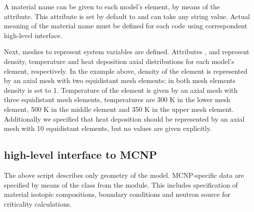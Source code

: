\documentclass[a4paper,10pt,twocolumn,english]{sphinxsnamc2013}
\begin{document}
A material name can be given to each model's element, by means of the 
attribute.  This attribute is set by default  to  and can take
any string value.  Actual meaning of the material name must be defined for each
code using correspondent high-level interface.

Next, meshes to represent system variables are defined. Attributes ,
 and  represent density, temperature and heat deposition axial
distributions for each model's element, respectively. In the example above,
density of the element  is represented by an axial mesh with two equidistant
mesh elements; in both mesh elements density is set to 1.  Temperature of the element  is given by
an axial mesh with three equidistant mesh elements, temperatures are 300 K in the
lower mesh element, 500 K in the middle element and 350 K in the upper mesh
element. Additionally we specified that heat deposition should be represented by an axial
mesh with 10 equidistant elements, but no values are given explicitly.


\subsection{high-level interface to MCNP}
\label{paper:high-level-interface-to-mcnp}
The above script describes only geometry of the model. MCNP-specific data are
specified by means of the  class from the  module.
This includes specification of material isotopic compositions, boundary
conditions and neutron source for criticality calculations.
\end{document}
